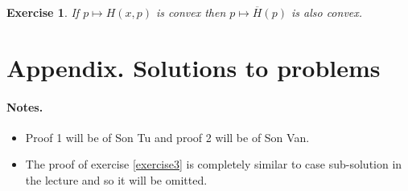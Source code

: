 \documentclass[12pt, oneside]{amsart}  	%
\newtheorem{exercise}{Exercise}
\begin{document}


\begin{exercise}\label{exercise5} If $p\longmapsto H(x,p)$ is convex then $p\mapsto \overline{H}(p)$ is also convex.
\end{exercise}














\newpage
\appendix
\section*{Appendix. Solutions to problems}
\vspace*{0.6cm}

\paragraph{\textbf{Notes.}}
\begin{itemize}
\item Proof 1 will be of Son Tu and proof 2 will be of Son Van.
\item The proof of exercise \ref{exercise3} is completely similar to case sub-solution in the lecture and so it will be omitted.
\end{itemize}

\vspace*{0.6cm}
\end{document}

